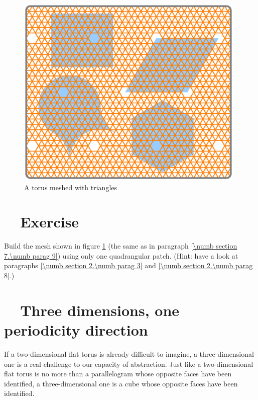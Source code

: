 \begin{figure}[ht] \centering
  \includegraphics[width=110mm]{flat-torus-5.eps}
  \caption{A torus meshed with triangles}
  \label{\numb section 7.\numb fig 6}
\end{figure}


\section{~~Exercise}\label{\numb section 7.\numb parag 10}

Build the mesh shown in figure \ref{\numb section 7.\numb fig 6}
(the same as in paragraph \ref{\numb section 7.\numb parag 9}) using only one quadrangular patch.
(Hint: have a look at paragraphs \ref{\numb section 2.\numb parag 3} and
\ref{\numb section 2.\numb parag 8}.)


\section{~~Three dimensions, one periodicity direction}\label{\numb section 7.\numb parag 11}

If a two-dimensional flat torus is already difficult to imagine,
a three-dimensional one is a real challenge to our capacity of abstraction.
Just like a two-dimensional flat torus is no more than a parallelogram whose opposite faces
have been identified, a three-dimensional one is a cube whose opposite faces have been identified.

